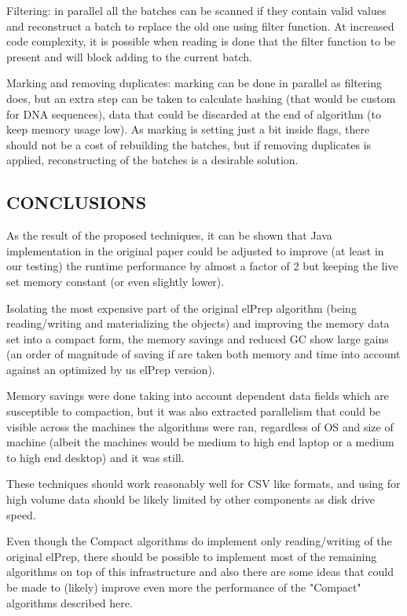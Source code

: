 \documentclass[a4paper,twoside]{article}
\begin{document}
Filtering: in parallel all the batches can be scanned if they contain valid values and reconstruct a batch to replace the old one using filter function.
At increased code complexity, it is possible when reading is done that the filter function to be present and will block adding to the current batch.

Marking and removing duplicates: marking can be done in parallel as filtering does, but an extra step can be taken to calculate hashing (that would be custom for DNA sequences), data that could be discarded at the end of algorithm (to keep memory usage low).
As marking is setting just a bit inside flags, there should not be a cost of rebuilding the batches, but if removing duplicates is applied, reconstructing of the batches is a desirable solution.


\subsection{\uppercase{Conclusions}}\label{subsec:uppercase2}

As the result of the proposed techniques, it can be shown that Java implementation in the original paper
could be adjusted to improve (at least in our testing) the runtime performance by almost a factor of 2 but keeping the live set memory constant (or even slightly lower).

Isolating the most expensive part of the original elPrep algorithm (being reading/writing and materializing the objects) and improving the memory data set into a compact form, the memory savings and
reduced GC show large gains (an order of magnitude of saving if are taken both memory and time into account against an optimized by us elPrep version).

Memory savings were done taking into account dependent data fields which are susceptible to compaction, but it was also extracted parallelism that could be visible across the machines the algorithms were ran,
regardless of OS and size of machine (albeit the machines would be medium to high end laptop or a medium to high end desktop) and it was still. 

These techniques should work reasonably well for CSV like formats, and using for high volume data 
should be likely limited by other components as disk drive speed.

Even though the Compact algorithms do implement only reading/writing of the original elPrep, there
should be possible to implement most of the remaining algorithms on top of this infrastructure and also there are some ideas that could be made to (likely) improve even more the performance of the "Compact" algorithms described here.
\end{document}

